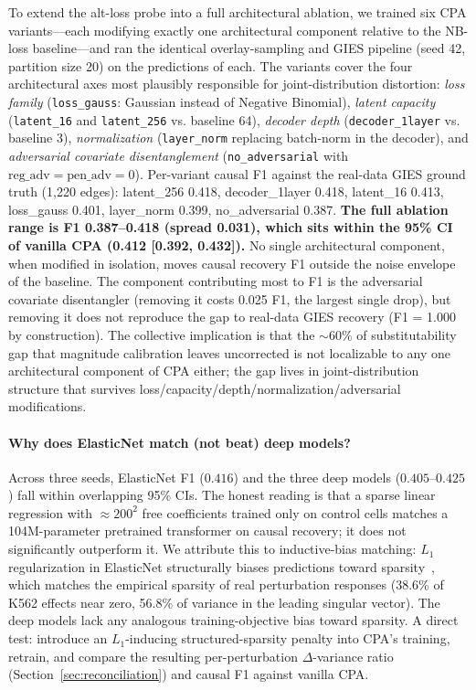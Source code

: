 \documentclass{article}
\theoremstyle{plain}
\theoremstyle{definition}
\theoremstyle{remark}
\begin{document}
To extend the alt-loss probe into a full architectural ablation, we trained six CPA variants---each modifying exactly one architectural component relative to the NB-loss baseline---and ran the identical overlay-sampling and GIES pipeline (seed 42, partition size 20) on the predictions of each. The variants cover the four architectural axes most plausibly responsible for joint-distribution distortion: \textit{loss family} (\texttt{loss\_gauss}: Gaussian instead of Negative Binomial), \textit{latent capacity} (\texttt{latent\_16} and \texttt{latent\_256} vs. baseline 64), \textit{decoder depth} (\texttt{decoder\_1layer} vs. baseline 3), \textit{normalization} (\texttt{layer\_norm} replacing batch-norm in the decoder), and \textit{adversarial covariate disentanglement} (\texttt{no\_adversarial} with $\mathrm{reg\_adv}=\mathrm{pen\_adv}=0$). Per-variant causal F1 against the real-data GIES ground truth (1{,}220 edges):  latent\_256 0.418, decoder\_1layer 0.418, latent\_16 0.413, loss\_gauss 0.401, layer\_norm 0.399, no\_adversarial 0.387. \textbf{The full ablation range is F1 0.387--0.418 (spread 0.031), which sits within the 95\% CI of vanilla CPA (0.412 [0.392, 0.432]).} No single architectural component, when modified in isolation, moves causal recovery F1 outside the noise envelope of the baseline. The component contributing most to F1 is the adversarial covariate disentangler (removing it costs 0.025 F1, the largest single drop), but removing it does not reproduce the gap to real-data GIES recovery (F1 = 1.000 by construction). The collective implication is that the ${\sim}60\%$ of substitutability gap that magnitude calibration leaves uncorrected is not localizable to any one architectural component of CPA either; the gap lives in joint-distribution structure that survives loss/capacity/depth/normalization/adversarial modifications.

\paragraph{Why does ElasticNet match (not beat) deep models?}
Across three seeds, ElasticNet F1 ($0.416$) and the three deep models ($0.405$--$0.425$) fall within overlapping 95\% CIs. The honest reading is that a sparse linear regression with $\approx\!200^2$ free coefficients trained only on control cells matches a 104M-parameter pretrained transformer on causal recovery; it does not significantly outperform it. We attribute this to inductive-bias matching: $L_1$ regularization in ElasticNet structurally biases predictions toward sparsity~\citep{zou2005elasticnet}, which matches the empirical sparsity of real perturbation responses (38.6\% of K562 effects near zero, 56.8\% of variance in the leading singular vector). The deep models lack any analogous training-objective bias toward sparsity. A direct test: introduce an $L_1$-inducing structured-sparsity penalty into CPA's training, retrain, and compare the resulting per-perturbation $\Delta$-variance ratio (Section~\ref{sec:reconciliation}) and causal F1 against vanilla CPA.
\end{document}
